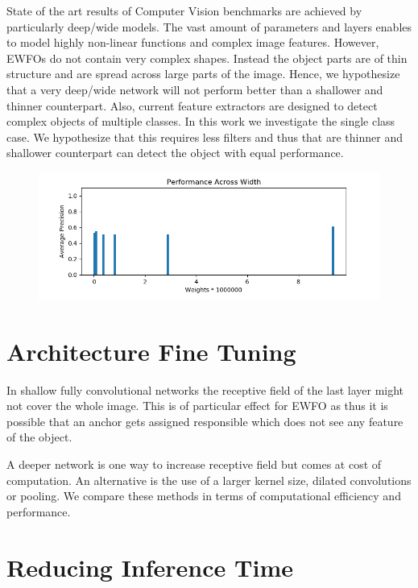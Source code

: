 	State of the art results of Computer Vision benchmarks are achieved by particularly deep/wide models. The vast amount of parameters and layers enables to model highly non-linear functions and complex image features. However, \acp{EWFO} do not contain very complex shapes. Instead the object parts are of thin structure and are spread across large parts of the image. Hence, we hypothesize that a very deep/wide network will not perform better than a shallower and thinner counterpart. Also, current feature extractors are designed to detect complex objects of multiple classes. In this work we investigate the single class case. We hypothesize that this requires less filters and thus that are thinner and shallower counterpart can detect the object with equal performance.
	
	\begin{figure}
		\includegraphics[width=\textwidth]{fig/perf_width}
	\end{figure}
	
	\section{Architecture Fine Tuning}
	
	In shallow fully convolutional networks the receptive field of the last layer might not cover the whole image. This is of particular effect for \ac{EWFO} as thus it is possible that an anchor gets assigned responsible which does not see any feature of the object.
	
	A deeper network is one way to increase receptive field but comes at cost of computation. An alternative is the use of a larger kernel size, dilated convolutions or pooling. We compare these methods in terms of computational efficiency and performance.
		
	\section{Reducing Inference Time}
	

